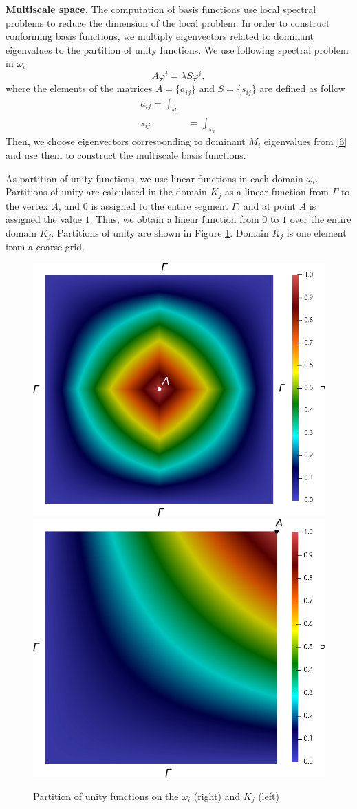 \documentclass[authoryear]{elsarticle}
\begin{document}
 
\textbf{Multiscale space.}
The computation of basis functions use local spectral problems to reduce the dimension of the local problem. 
In order to construct conforming basis functions, we multiply eigenvectors related to dominant eigenvalues to the partition of unity functions.
We use following spectral problem in $\omega_i$
\begin{equation}\label{8}
	A \varphi^i = \lambda S \varphi^i,
\end{equation} 
where the elements of the matrices $A= \{ a_{ij} \}$ and $S = \{ s_{ij} \}$ are defined as follow{
\begin{equation}\label{9}
\begin{split}
	a_{ij} = 
	\int_{\omega_i}  \\
	s_{ij} & = \int_{\omega _i}
\end{split}
\end{equation}}
Then, we choose eigenvectors corresponding to dominant $M_{i}$ eigenvalues from \eqref{6} and use them to construct the multiscale basis functions.

As  partition of unity functions, we use linear functions in each domain $\omega_i$.
Partitions of unity are calculated in the domain $ K_j $ as a linear function from $\Gamma$ to the vertex $ A $, and $ 0 $ is assigned to the entire segment $\Gamma$, and at point $ A $ is assigned the value $1$. 
Thus, we obtain a linear function from $ 0 $ to $ 1 $ over the entire domain $ K_j $. 
Partitions of unity are shown in Figure \ref{p2}. 
Domain $K_j$  is one element from a coarse grid. 

\begin{figure}[h]
	\centering
		\includegraphics[width=0.45\linewidth]{pofs.png} \hspace{2em}
		\includegraphics[width=0.45\linewidth]{pouK.png} 
	\caption{Partition of unity functions on the $\omega_i$ (right) and $K_j$ (left)}
	\label{p2}
\end{figure} 
 
\end{document}
